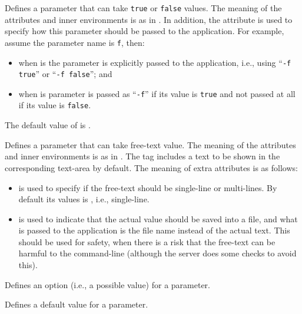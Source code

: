 \bigskip
{}
{%
%
  Defines a parameter that can take \texttt{true} or \texttt{false}
  values. The meaning of the attributes and inner environments is as
  in . In addition, the attribute
   is used to specify how this parameter
  should be passed to the application. For example, assume the
  parameter name is \texttt{f}, then:
  \begin{itemize}
  \item when  is  the
    parameter is explicitly passed to the application, i.e., using
    ``\texttt{-f true}'' or ``\texttt{-f false}''; and
  \item when  is 
    parameter is passed as ``\texttt{-f}'' if its value is
    \texttt{true} and not passed at all if its value is
    \texttt{false}.
  \end{itemize}
%
  The default value of  is
  .
%
}
{}%

\bigskip
{}
{%
%
  Defines a parameter that can take free-text value. The meaning of
  the attributes and inner environments is as in
  . The  tag includes a text
  to be shown in the corresponding text-area by default.  The meaning
  of extra attributes is as follows:
%
\begin{itemize}
%
\item {} is used to specify if the free-text
  should be single-line or multi-lines. By default its values is
  , i.e., single-line.
%
\item {} is used to indicate that the actual
  value should be saved into a file, and what is passed to the
  application is the file name instead of the actual text. 
  This should be used for safety, when there is a risk that the
  free-text can be harmful to the command-line (although the server
  does some checks to avoid this).
%
\end{itemize}
}
{}%

\bigskip
{}
{%
Defines an option (i.e., a possible value) for a parameter.
}
{}%

\bigskip
{}
{%
Defines a default value for a parameter.
}
{}%


{}

